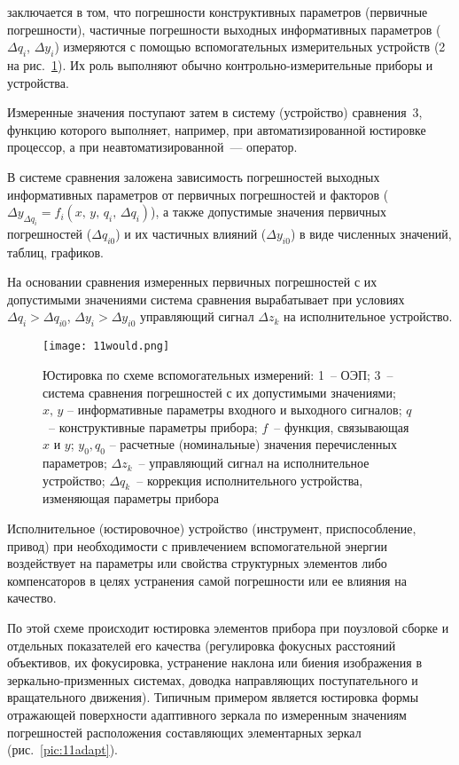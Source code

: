  заключается в том, что погрешности конструктивных параметров (первичные погрешности), частичные погрешности выходных информативных параметров ($ \Delta q_i $, $ \Delta y_i $) измеряются с помощью вспомогательных измерительных устройств (2 на рис.~\ref{pic:11would}). 
Их роль выполняют обычно контрольно-измерительные приборы и устройства.

Измеренные значения поступают затем в систему (устройство) сравнения~3, функцию которого выполняет, например, при автоматизированной юстировке процессор, а при неавтоматизированной~--- опе\-ра\-тор.

В системе сравнения заложена зависимость погрешностей выходных информативных параметров от первичных погрешностей и факторов ($ \Delta y_{\Delta q_i} = f_i(x,\,y,\,q_i,\,\Delta q_i) $), а также допустимые значения первичных погрешностей ($ \Delta q_{i0} $) и их частичных влияний ($ \Delta y_{i0} $) в виде численных значений, таблиц, графиков.

На основании сравнения измеренных первичных погрешностей с их допустимыми значениями система сравнения вырабатывает при условиях $ \Delta q_i > \Delta q_{i0} $, $ \Delta y_i > \Delta y_{i0} $ управляющий сигнал $ \Delta z_k $ на исполнительное устройство.

\begin{figure}[h!]
	\texttt{[image: 11would.png]}
	\caption[Юстировка по схеме вспомогательных измерений]{ Юстировка по схеме вспомогательных измерений: 1~-- ОЭП; 3~-- система сравнения погрешностей с их допустимыми значениями; $ x,\,y $ -- информативные параметры входного и выходного сигналов; $ q $~-- конструктивные параметры прибора; $ f $~-- функция, связывающая $ x $ и $ y $; $ y_0, q_0 $ -- расчетные (номинальные) значения перечисленных параметров; $ \Delta z_k $~-- управляющий сигнал на исполнительное устройство; $ \Delta q_k $~-- коррекция исполнительного устройства, изменяющая параметры прибора }
	\label{pic:11would}
\end{figure}

Исполнительное (юстировочное) устройство (инструмент, приспособление, привод) при необходимости с привлечением вспомогательной энергии воздействует на параметры или свойства структурных элементов либо компенсаторов в целях устранения самой погрешности или ее влияния на качество.

По этой схеме происходит юстировка элементов прибора при поузловой сборке и отдельных показателей его качества (регулировка фокусных расстояний объективов, их фокусировка, устранение наклона или биения изображения в зеркально-призменных системах, доводка направляющих поступательного и вращательного движения). Типичным примером является юстировка формы отражающей поверхности адаптивного зеркала по измеренным значениям погрешностей расположения составляющих элементарных зеркал (рис.~\ref{pic:11adapt}).

